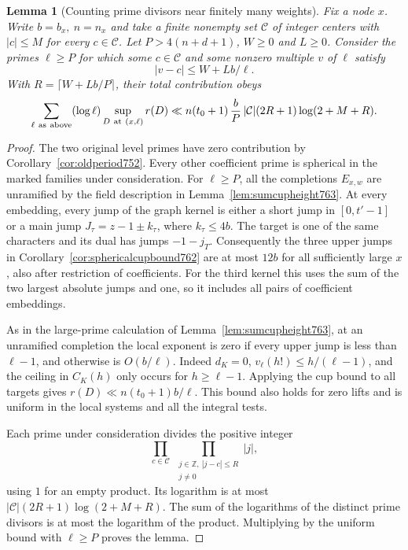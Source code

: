 \documentclass[a4paper,11pt]{article}
\newtheorem{lemma}[proposition]{Lemma}
\theoremstyle{definition}
\theoremstyle{remark}
\newcommand{\ZZ}{\mathbb Z}\newcommand{\ord}{\operatorname{ord}}
\numberwithin{equation}{section}
\begin{document}
\begin{lemma}[Counting prime divisors near finitely many weights]
\leavevmode\label{lem:nearweightprimes766}
Fix a node \(x\). Write \(b=b_x,\ n=n_x\) and take a finite
nonempty set \(\mathcal C\) of integer centers with
\(|c|\le M\) for every \(c\in\mathcal C\). Let
\(P>4(n+d+1)\), \(W\ge0\) and \(L\ge0\). Consider the
primes \(\ell\ge P\) for which some \(c\in\mathcal C\)
and some nonzero multiple \(v\) of \(\ell\) satisfy
\[
                       |v-c|\le W+Lb/\ell .
\]
With \(R=\lceil W+Lb/P\rceil\), their total contribution obeys
\[
 \sum_{\ell\ {\rm as\ above}}(\log\ell)
                \sup_{D\ {\rm at}\ (x,\ell)} r(D)
 \ll n(t_0+1)\,\frac bP\,
          |\mathcal C|(2R+1)\log(2+M+R).
\]
\end{lemma}
\begin{proof}
The two original level primes have zero contribution by
Corollary~\ref{cor:oldperiod752}. Every other coefficient
prime is spherical in the marked families under consideration.
For \(\ell\ge P\), all the completions \(E_{x,w}\) are
unramified by the field description in
Lemma~\ref{lem:sumcupheight763}. At every embedding, every
jump of the graph kernel is either a short jump in
\([0,t'-1]\) or a main jump \(J_\tau=z-1\pm k_\tau\),
where \(k_\tau\le4b\). The target is one of the same
characters and its dual has jumps \(-1-j_T\).
Consequently the three upper jumps in
Corollary~\ref{cor:sphericalcupbound762} are at most
\(12b\) for all sufficiently large \(x\), also after
restriction of coefficients. For the third kernel this
uses the sum of the two largest absolute jumps and one,
so it includes all pairs of coefficient embeddings.

As in the large-prime calculation of
Lemma~\ref{lem:sumcupheight763}, at an unramified completion
the local exponent is zero if every upper jump is less
than \(\ell-1\), and otherwise is \(O(b/\ell)\).
Indeed \(d_K=0\), \(v_\ell(h!)\le h/(\ell-1)\), and
the ceiling in \(C_K(h)\) only occurs for \(h\ge\ell-1\).
Applying the cup bound to all targets gives
\(r(D)\ll n(t_0+1)b/\ell\). This bound also holds for
zero lifts and is uniform in the local systems and all the
integral tests.

Each prime under consideration divides the positive integer
\[
          \prod_{c\in\mathcal C}
          \ \prod_{\substack{j\in\ZZ,\ |j-c|\le R\\j\ne0}}|j|,
\]
using \(1\) for an empty product. Its logarithm is at most
\(|\mathcal C|(2R+1)\log(2+M+R)\). The sum of the logarithms
of the distinct prime divisors is at most the logarithm
of the product. Multiplying by the uniform bound with
\(\ell\ge P\) proves the lemma.
\end{proof}
\end{document}
